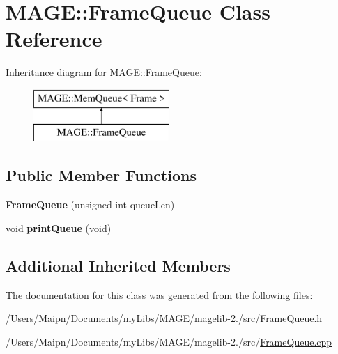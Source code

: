 \hypertarget{class_m_a_g_e_1_1_frame_queue}{\section{M\-A\-G\-E\-:\-:Frame\-Queue Class Reference}
\label{class_m_a_g_e_1_1_frame_queue}
}
Inheritance diagram for M\-A\-G\-E\-:\-:Frame\-Queue\-:\begin{figure}[H]
\begin{center}
\leavevmode
\includegraphics[height=2.000000cm]{class_m_a_g_e_1_1_frame_queue}
\end{center}
\end{figure}
\subsection*{Public Member Functions}
\begin{DoxyCompactItemize}
\item 
\hypertarget{class_m_a_g_e_1_1_frame_queue_ac0e14776a1fff8f7c08680228bf7b928}{{\bfseries Frame\-Queue} (unsigned int queue\-Len)}\label{class_m_a_g_e_1_1_frame_queue_ac0e14776a1fff8f7c08680228bf7b928}

\item 
\hypertarget{class_m_a_g_e_1_1_frame_queue_ad57e61773de705ea155e62f6956fc2f5}{void {\bfseries print\-Queue} (void)}\label{class_m_a_g_e_1_1_frame_queue_ad57e61773de705ea155e62f6956fc2f5}

\end{DoxyCompactItemize}
\subsection*{Additional Inherited Members}


The documentation for this class was generated from the following files\-:\begin{DoxyCompactItemize}
\item 
/\-Users/\-Maipn/\-Documents/my\-Libs/\-M\-A\-G\-E/magelib-\/2./src/\hyperlink{_frame_queue_8h}{Frame\-Queue.\-h}\item 
/\-Users/\-Maipn/\-Documents/my\-Libs/\-M\-A\-G\-E/magelib-\/2./src/\hyperlink{_frame_queue_8cpp}{Frame\-Queue.\-cpp}\end{DoxyCompactItemize}
